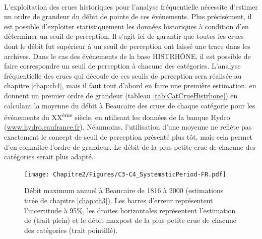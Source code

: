 	\paragraph{} L'exploitation des crues historiques pour l'analyse fréquentielle nécessite d'estimer un ordre de grandeur du débit de pointe de ces événements. Plus précisément, il est possible d'exploiter statistiquement les données historiques à condition d'en déterminer un seuil de perception. Il s'agit ici de garantir que toutes les crues dont le débit fut supérieur à un seuil de perception ont laissé une trace dans les archives. Dans le cas des événements de la base HISTRHÔNE, il est possible de faire correspondre un seuil de perception à chacune des catégories. L'analyse fréquentielle des crues qui découle de ces seuils de perception sera réalisée au chapitre \ref{chap:ch4}, mais il faut tout d'abord en faire une première estimation. \citet{pichard_hydro-climatology_2017} en donnent un premier ordre de grandeur (tableau \ref{tab:CatCrueHistrhone}) en calculant la moyenne du débit à Beaucaire des crues de chaque catégorie pour les événements du XX\textsuperscript{ème} siècle, en utilisant les données de la banque Hydro (\url{www.hydro.eaufrance.fr}). Néanmoins, l'utilisation d'une moyenne ne reflète pas exactement le concept de seuil de perception présenté plus tôt, mais cela permet d'en connaitre l'ordre de grandeur. Le débit de la plus petite crue de chacune des catégories serait plus adapté. 
	
	\begin{figure}[h]
	\centering
		\texttt{[image: Chapitre2/Figures/C3-C4\_SystematicPeriod-FR.pdf]}
        \caption{Débit maximum annuel à Beaucaire de 1816 à 2000 (estimations tirée de chapitre \ref{chap:ch3}). Les barres d'erreur représentent l'incertitude à 95\%, les droites horizontales représentent l'estimation de \citet{pichard_hydro-climatology_2017} (trait plein) et le débit maxpost de la plus petite crue de chacune des catégories (trait pointillé).}
		\label{fig:C3-C4_Syst}
	\end{figure}
		
	
